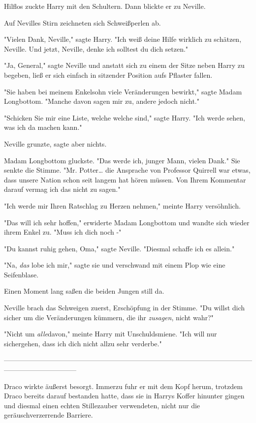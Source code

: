 {Hilflos zuckte Harry mit den Schultern. Dann blickte er zu Neville.

Auf Nevilles Stirn zeichneten sich Schweißperlen ab.

"Vielen Dank, Neville," sagte Harry. "Ich weiß deine Hilfe wirklich zu schätzen, Neville. Und jetzt, Neville, denke ich solltest du dich setzen."

"Ja, General," sagte Neville und anstatt sich zu einem der Sitze neben Harry zu begeben, ließ er sich einfach in sitzender Position aufs Pflaster fallen.

"Sie haben bei meinem Enkelsohn viele Veränderungen bewirkt," sagte Madam Longbottom. "Manche davon sagen mir zu, andere jedoch nicht."

"Schicken Sie mir eine Liste, welche welche sind," sagte Harry. "Ich werde sehen, was ich da machen kann."

Neville grunzte, sagte aber nichts.

Madam Longbottom gluckste. "Das werde ich, junger Mann, vielen Dank." Sie senkte die Stimme. "Mr. Potter… die Ansprache von Professor Quirrell war etwas, dass unsere Nation schon seit langem hat hören müssen. Von Ihrem Kommentar darauf vermag ich das nicht zu sagen."

"Ich werde mir Ihren Ratschlag zu Herzen nehmen," meinte Harry versöhnlich.

"Das will ich sehr hoffen," erwiderte Madam Longbottom und wandte sich wieder ihrem Enkel zu. "Muss ich dich noch -"

"Du kannst ruhig gehen, Oma," sagte Neville. "Diesmal schaffe ich es allein."

"Na, \emph{das} lobe ich mir," sagte sie und verschwand mit einem Plop wie eine Seifenblase.

Einen Moment lang saßen die beiden Jungen still da.

Neville brach das Schweigen zuerst, Erschöpfung in der Stimme. "Du willst dich sicher um die Veränderungen kümmern, die ihr \emph{zusagen}, nicht wahr?"

"Nicht um \emph{alle}davon," meinte Harry mit Unschuldsmiene. "Ich will nur sichergehen, dass ich dich nicht allzu sehr verderbe."

--------------------------------------------------------------------------------------------------------------------------------------------

Draco wirkte äußerst besorgt. Immerzu fuhr er mit dem Kopf herum, trotzdem Draco bereits darauf bestanden hatte, dass sie in Harrys Koffer hinunter gingen und diesmal einen echten Stillezauber verwendeten, nicht nur die geräuschverzerrende Barriere.

}
